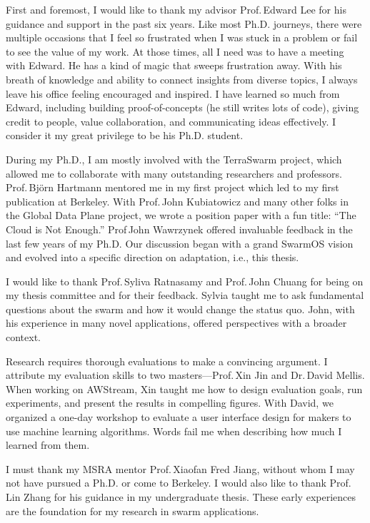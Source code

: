 \documentclass[thesis.tex]{subfiles}
\begin{document}
\begin{acknowledgements}

  First and foremost, I would like to thank my advisor Prof.\,Edward Lee for his
  guidance and support in the past six years. Like most Ph.D. journeys, there
  were multiple occasions that I feel so frustrated when I was stuck in a
  problem or fail to see the value of my work. At those times, all I need was to
  have a meeting with Edward. He has a kind of magic that sweeps frustration
  away. With his breath of knowledge and ability to connect insights from
  diverse topics, I always leave his office feeling encouraged and inspired. I
  have learned so much from Edward, including building proof-of-concepts (he
  still writes lots of code), giving credit to people, value collaboration, and
  communicating ideas effectively. I consider it my great privilege to be his
  Ph.D. student.

  During my Ph.D., I am mostly involved with the TerraSwarm project, which
  allowed me to collaborate with many outstanding researchers and
  professors. Prof.\,Bj\"orn Hartmann mentored me in my first project which led
  to my first publication at Berkeley. With Prof.\,John Kubiatowicz and many
  other folks in the Global Data Plane project, we wrote a position paper with a
  fun title: ``The Cloud is Not Enough.'' Prof\,John Wawrzynek offered
  invaluable feedback in the last few years of my Ph.D. Our discussion began
  with a grand SwarmOS vision and evolved into a specific direction on
  adaptation, i.e., this thesis.

  I would like to thank Prof.\,Syliva Ratnasamy and Prof.\,John Chuang for being
  on my thesis committee and for their feedback. Sylvia taught me to ask
  fundamental questions about the swarm and how it would change the status
  quo. John, with his experience in many novel applications, offered
  perspectives with a broader context.

  Research requires thorough evaluations to make a convincing argument. I
  attribute my evaluation skills to two masters---Prof.\,Xin Jin and Dr.\,David
  Mellis. When working on AWStream, Xin taught me how to design evaluation
  goals, run experiments, and present the results in compelling figures. With
  David, we organized a one-day workshop to evaluate a user interface design for
  makers to use machine learning algorithms. Words fail me when describing how
  much I learned from them.

  I must thank my MSRA mentor Prof.\,Xiaofan Fred Jiang, without whom I may not
  have pursued a Ph.D. or come to Berkeley. I would also like to thank
  Prof.\,Lin Zhang for his guidance in my undergraduate thesis. These early
  experiences are the foundation for my research in swarm applications.


\end{acknowledgements}
\end{document}
